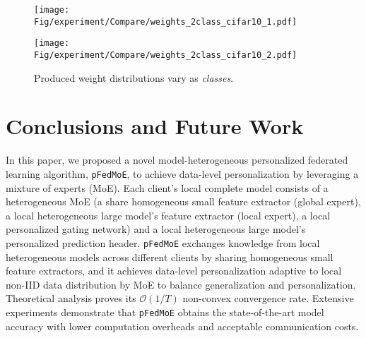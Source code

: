 \documentclass[sigconf]{acmart}
\newcommand{\hetero}{heterogeneous }
\newcommand{\homo}{homogeneous }
\newcommand{\pers}{personalized }
\newcommand{\gen}{generalized }
\newcommand{\persN}{personalization }
\newcommand{\genN}{generalization }
\newcommand{\rep}{representation }
\newcommand{\reps}{representations }
\newcommand{\sota}{state-of-the-art }
\newcommand{\methodname}{{\tt{pFedMoE}}}
\begin{document}
\begin{figure}[t]
\centering
\begin{minipage}[t]{0.5\linewidth}
\centering
\texttt{[image: Fig/experiment/Compare/weights\_2class\_cifar10\_1.pdf]}
\end{minipage}%
\begin{minipage}[t]{0.5\linewidth}
\centering
\texttt{[image: Fig/experiment/Compare/weights\_2class\_cifar10\_2.pdf]}
\end{minipage}%
\caption{Produced weight distributions vary as \textit{classes}.}
\label{fig:compare-weights_2class}
\end{figure}


\section{Conclusions and Future Work}
In this paper, we proposed a novel model-\hetero \pers federated learning algorithm, \methodname{}, to achieve data-level \persN by leveraging a mixture of experts (MoE). Each client's local complete model consists of a \hetero MoE (a share \homo small feature extractor (global expert), a local \hetero large model's feature extractor (local expert), a local \pers gating network) and a local \hetero large model's \pers prediction header.
\methodname{} exchanges knowledge from local \hetero models across different clients by sharing \homo small feature extractors, and it achieves data-level \persN adaptive to local non-IID data distribution by MoE to balance \genN and personalization. 
Theoretical analysis proves its $\mathcal{O}(1/T)$ non-convex convergence rate.
Extensive experiments demonstrate that \methodname{} obtains the \sota model accuracy with lower computation overheads and acceptable communication costs. 
\end{document}
